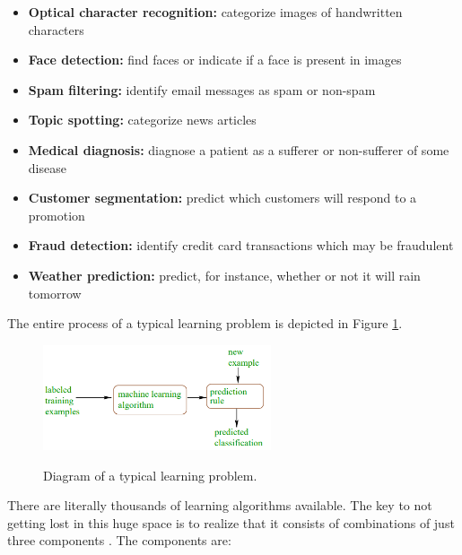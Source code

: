 \documentclass[12pt]{article}
\numberwithin{equation}{section}
\numberwithin{table}{section}
\numberwithin{figure}{section}
\begin{document}
\begin{itemize}
	\item \textbf{Optical character recognition:} categorize images of handwritten characters 
	\item \textbf{Face detection:} find faces or indicate if a face is present in images 
	\item \textbf{Spam filtering:} identify email messages as spam or non-spam
	\item \textbf{Topic spotting:} categorize news articles
	\item \textbf{Medical diagnosis:} diagnose a patient as a sufferer or non-sufferer of some disease
	\item \textbf{Customer segmentation:} predict which customers will respond to a promotion
	\item \textbf{Fraud detection:} identify credit card transactions which may be fraudulent
	\item \textbf{Weather prediction:} predict, for instance, whether or not it will rain tomorrow
\end{itemize}


The entire process of a typical learning problem is depicted in Figure \ref{figure4}.
\begin{figure}[H] \centering
	\caption{Diagram of a typical learning problem. }
	\includegraphics[width=0.6\textwidth]{image4.png}
	\label{figure4}
\end{figure}

\noindent
There are literally thousands of learning algorithms available. The key to not getting lost in this huge space is to realize that it consists of combinations of just three components \cite{Domingos2012}. The components are:
\end{document}
